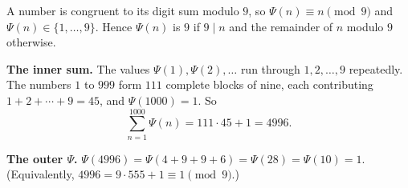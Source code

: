 A number is congruent to its digit sum modulo $9$, so $\Psi(n)\equiv n\pmod 9$ and $\Psi(n)\in\{1,\dots,9\}$. Hence $\Psi(n)$ is $9$ if $9\mid n$ and the remainder of $n$ modulo $9$ otherwise.

\textbf{The inner sum.} The values $\Psi(1),\Psi(2),\dots$ run through $1,2,\dots,9$ repeatedly. The numbers $1$ to $999$ form $111$ complete blocks of nine, each contributing $1+2+\cdots+9=45$, and $\Psi(1000)=1$. So
\[
\sum_{n=1}^{1000}\Psi(n)=111\cdot45+1=4996 .
\]

\textbf{The outer $\Psi$.} $\Psi(4996)=\Psi(4+9+9+6)=\Psi(28)=\Psi(10)=\boxed{1}$. (Equivalently, $4996=9\cdot555+1\equiv1\pmod9$.)
